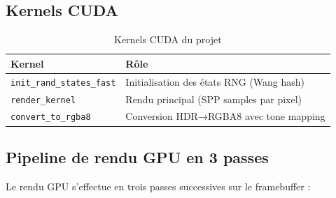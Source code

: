 \documentclass[12pt,a4paper]{article}
\begin{document}
\subsection{Kernels CUDA}

\begin{table}[H]
\centering
\begin{tabular}{lp{8cm}}
\toprule
\textbf{Kernel} & \textbf{Rôle} \\
\midrule
\texttt{init\_rand\_states\_fast}    & Initialisation des états RNG (Wang hash) \\
\texttt{render\_kernel}              & Rendu principal (SPP samples par pixel) \\
\texttt{convert\_to\_rgba8}          & Conversion HDR→RGBA8 avec tone mapping \\
\bottomrule
\end{tabular}
\caption{Kernels CUDA du projet}
\end{table}

\subsection{Pipeline de rendu GPU en 3 passes}

Le rendu GPU s'effectue en trois passes successives sur le framebuffer :
\end{document}
